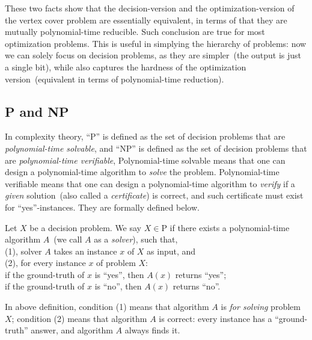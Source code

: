These two facts show that the decision-version and the optimization-version
of the vertex cover problem are essentially equivalent, in terms of that they are mutually polynomial-time reducible.
Such conclusion are true for most optimization problems.
This is useful in simplying the hierarchy of problems: now we can solely focus on decision problems, as they are simpler~(the output is just a single bit),
while also captures the hardness of the optimization version~(equivalent in terms of polynomial-time reduction).

\subsection*{P and NP}

In complexity theory, ``P'' is defined as the set of decision problems that are \emph{polynomial-time solvable}, 
and ``NP'' is defined as the set of decision problems that are \emph{polynomial-time verifiable}, 
Polynomial-time solvable means that one can design a polynomial-time algorithm to \emph{solve} the problem.
Polynomial-time verifiable means that one can design a polynomial-time algorithm to \emph{verify}
if a \emph{given} solution~(also called a \emph{certificate}) is correct,  
and such certificate must exist for ``yes''-instances.
They are formally defined below.


\begin{definition}[P]
Let $X$ be a decision problem. We say $X\in \textrm{P}$ if there exists a polynomial-time algorithm $A$~(we call $A$ as a \emph{solver}), such that,\\
	(1), solver $A$ takes an instance $x$ of $X$ as input, and \\
	(2), for every instance $x$ of problem $X$: \\
	\hspace*{0.2cm} if the ground-truth of $x$ is ``yes'', then $A(x)$ returns ``yes'';\\
	\hspace*{0.2cm} if the ground-truth of $x$ is ``no'', then $A(x)$ returns ``no''.
\end{definition}

In above definition, condition (1) means that algorithm $A$ is \emph{for solving} problem $X$;
condition (2) means that algorithm $A$ is correct: every instance has a ``ground-truth'' answer, and
algorithm $A$ always finds it.

